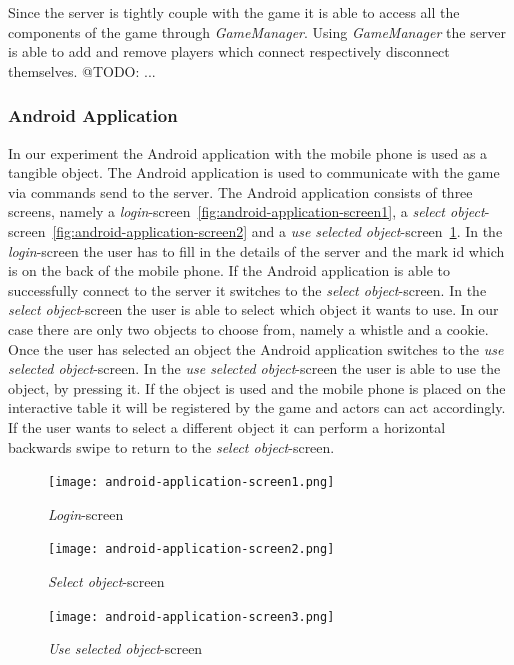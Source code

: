 \documentclass[a4paper,10pt]{article}
\begin{document}
		Since the server is tightly couple with the game it is able to access all the components of the game through \emph{GameManager}.
		Using \emph{GameManager} the server is able to add and remove players which connect respectively disconnect themselves.
		@TODO: ... 
		
		\subsubsection{Android Application}
		In our experiment the Android application with the mobile phone is used as a tangible object.
		The Android application is used to communicate with the game via commands send to the server.
		The Android application consists of three screens, namely a \emph{login}-screen~\ref{fig:android-application-screen1}, a \emph{select object}-screen~\ref{fig:android-application-screen2} and a \emph{use selected object}-screen~\ref{fig:android-application-screen3}.
		In the \emph{login}-screen the user has to fill in the details of the server and the mark id which is on the back of the mobile phone.
		If the Android application is able to successfully connect to the server it switches to the \emph{select object}-screen.
		In the \emph{select object}-screen the user is able to select which object it wants to use.
		In our case there are only two objects to choose from, namely a whistle and a cookie.
		Once the user has selected an object the Android application switches to the \emph{use selected object}-screen.
		In the \emph{use selected object}-screen the user is able to use the object, by pressing it.
		If the object is used and the mobile phone is placed on the interactive table it will be registered by the game and actors can act accordingly.
		If the user wants to select a different object it can perform a horizontal backwards swipe to return to the \emph{select object}-screen.
		
		\begin{figure}[ht]
			\begin{minipage}[b]{0.30\linewidth}
				\centering
				\texttt{[image: android-application-screen1.png]}
				\caption{\emph{Login}-screen}
				\label{fig:android-applications-sreen1}
			\end{minipage}
			\hspace{0.1cm}
			\begin{minipage}[b]{0.30\linewidth}
				\centering
				\texttt{[image: android-application-screen2.png]}
				\caption{\emph{Select object}-screen}
				\label{fig:android-application-screen2}
			\end{minipage}
			\hspace{0.1cm}
			\begin{minipage}[b]{0.30\linewidth}
				\centering
				\texttt{[image: android-application-screen3.png]}
				\caption{\emph{Use selected object}-screen}
				\label{fig:android-application-screen3}
			\end{minipage}
		\end{figure}
		
\end{document}
